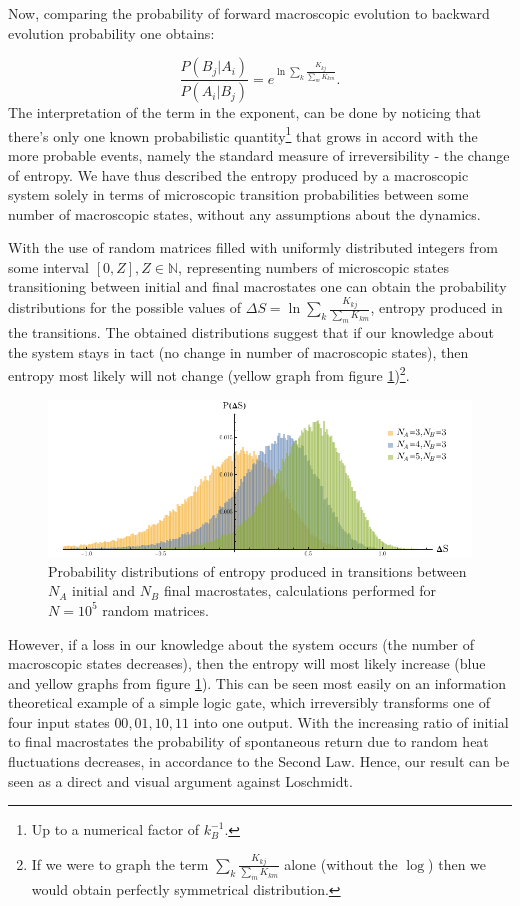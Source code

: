\documentclass[a4paper,12pt]{article}
\begin{document}
Now, comparing the probability of forward macroscopic evolution to backward evolution probability one obtains: 

\begin{equation}
\label{MacrostatesPRatio}
  \frac{P(B_j|A_i)}{P(A_i|B_j)}= e^{\ln{\sum_{k} \frac{K_{kj}}{\sum_m K_{km}}}}.
\end{equation}
The interpretation of the term in the exponent, can be done by noticing that there's only one known probabilistic quantity\footnote{Up to a numerical factor of $k_B^{-1}$.} that   grows in accord with the more probable events, namely the standard measure of irreversibility - the change of entropy.
We have thus described the entropy produced by a macroscopic system solely in terms of microscopic transition probabilities between some number of macroscopic states, without any assumptions about the dynamics. 

With the use of random matrices filled with uniformly distributed integers from some interval $[0,Z], Z \in \mathbb{N}$, representing numbers of microscopic states transitioning between initial and final macrostates one can obtain the probability distributions for the possible values of $\Delta S = \ln{\sum_{k} \frac{K_{kj}}{\sum_m K_{km}}} $, entropy produced in the transitions. The obtained distributions suggest that if our knowledge about the system stays in tact (no change in number of macroscopic states), then entropy most likely will not change (yellow graph from figure \ref{Fig5})\footnote{If we were to graph the term $\sum_{k} \frac{K_{kj}}{\sum_m K_{km}}$ alone (without the $\log$) then we would obtain perfectly symmetrical distribution.}.
\begin{figure}[ht!]
\centering \includegraphics[width=15cm]{Figure5} \caption{Probability distributions of entropy produced in transitions between $N_A$ initial and $N_B$ final macrostates, calculations performed for $N=10^5$ random matrices.}
\label{Fig5} 
\end{figure}
However, if a loss in our knowledge about the system occurs (the number of macroscopic states decreases), then the entropy will most likely increase (blue and yellow graphs from figure \ref{Fig5}). This can be seen most easily on an information theoretical example of a simple logic gate, which irreversibly transforms one of four input states $00,01,10,11$ into one output. With the increasing ratio of initial to final macrostates the probability of spontaneous return due to random heat fluctuations decreases, in accordance to the Second Law.
Hence, our result can be seen as a direct and visual argument against Loschmidt.
\end{document}
